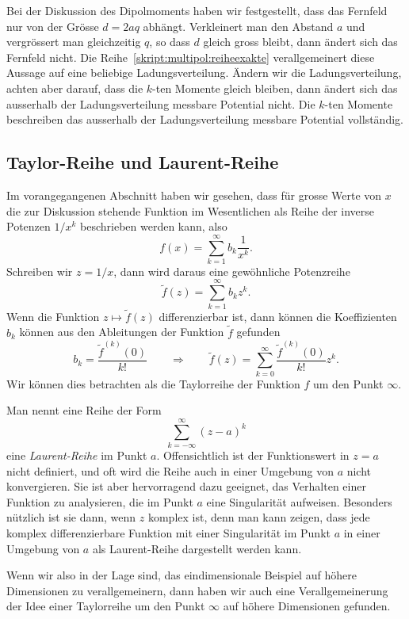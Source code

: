 Bei der Diskussion des Dipolmoments haben wir festgestellt, dass das
Fernfeld nur von der Grösse $d=2aq$ abhängt.
Verkleinert man den Abstand $a$ und vergrössert man gleichzeitig $q$,
so dass $d$ gleich gross bleibt, dann ändert sich das Fernfeld nicht.
Die Reihe~\eqref{skript:multipol:reiheexakte} verallgemeinert diese
Aussage auf eine beliebige Ladungsverteilung.
Ändern wir die Ladungsverteilung, achten aber darauf, dass die
$k$-ten Momente gleich bleiben, dann ändert sich das ausserhalb der
Ladungsverteilung messbare Potential nicht.
Die $k$-ten Momente beschreiben das ausserhalb der Ladungsverteilung
messbare Potential vollständig.

\subsection{Taylor-Reihe und Laurent-Reihe}
Im vorangegangenen Abschnitt haben wir gesehen, dass für grosse Werte von
$x$ die zur Diskussion stehende Funktion im Wesentlichen als Reihe
der inverse Potenzen $1/x^k$ beschrieben werden kann, also
\[
f(x)=\sum_{k=1}^\infty b_k\frac1{x^k}.
\]
Schreiben wir $z=1/x$, dann wird daraus eine gewöhnliche Potenzreihe
\[
\tilde f(z)=\sum_{k=1}^\infty b_k z^k.
\]
Wenn die Funktion $z\mapsto \tilde f(z)$ differenzierbar ist, dann
können die Koeffizienten $b_k$ können aus den Ableitungen der Funktion
$\tilde f$ gefunden
\begin{equation}
b_k=\frac{\tilde f^{(k)}(0)}{k!}
\qquad\Rightarrow\qquad
\tilde f(z)
=
\sum_{k=0}^\infty \frac{\tilde f^{(k)}(0)}{k!}z^k.
\end{equation}
Wir können dies betrachten als die Taylorreihe der Funktion $f$ um
den Punkt $\infty$.

Man nennt eine Reihe der Form
\[
\sum_{k=-\infty}^{\infty} (z-a)^k
\]
eine {\em Laurent-Reihe} im Punkt $a$.
Offensichtlich ist der Funktionswert in $z=a$ nicht definiert, und
oft wird die Reihe auch in einer Umgebung von $a$ nicht konvergieren.
Sie ist aber hervorragend dazu geeignet, das Verhalten einer Funktion
zu analysieren, die im Punkt $a$ eine Singularität aufweisen.
Besonders nützlich ist sie dann, wenn $z$ komplex ist, denn man
kann zeigen, dass jede komplex differenzierbare Funktion mit einer
Singularität im Punkt $a$ in einer Umgebung von $a$ als Laurent-Reihe
dargestellt werden kann.

Wenn wir also in der Lage sind, das eindimensionale Beispiel auf höhere
Dimensionen zu verallgemeinern, dann haben wir auch eine Verallgemeinerung
der Idee einer Taylorreihe um den Punkt $\infty$ auf höhere Dimensionen
gefunden.








